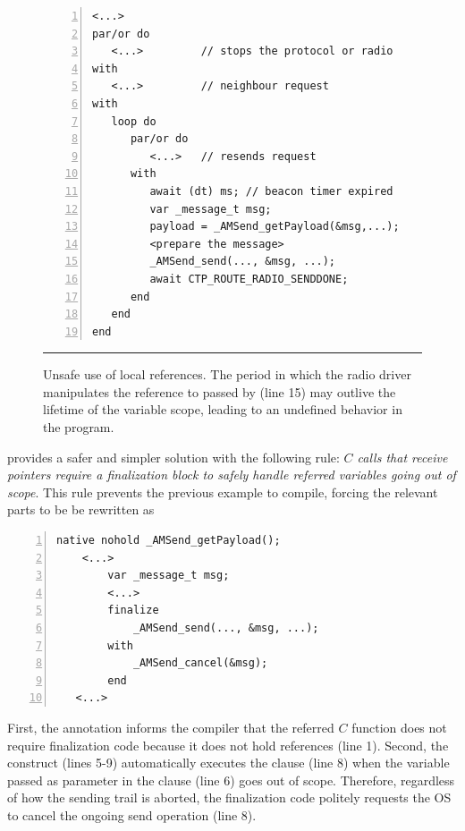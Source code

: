 \begin{figure}[t]
\begin{lstlisting}[numbers=left,xleftmargin=2em]
<...>
par/or do
   <...>         // stops the protocol or radio
with
   <...>         // neighbour request
with
   loop do
      par/or do
         <...>   // resends request
      with
         await (dt) ms; // beacon timer expired
         var _message_t msg;
         payload = _AMSend_getPayload(&msg,...);
         <prepare the message>
         _AMSend_send(..., &msg, ...);
         await CTP_ROUTE_RADIO_SENDDONE;
      end
   end
end
\end{lstlisting}
%
\rule{14cm}{0.37pt}
\caption{ Unsafe use of local references. \newline
{\small %
The period in which the radio driver manipulates the reference to  
passed by  (line 15) may outlive the lifetime of the 
variable scope, leading to an undefined behavior in the program.
}%
\label{lst.local}
}
\end{figure}

\CEU provides a safer and simpler solution with the following rule:
\emph{$C$ calls that receive pointers require a finalization block to safely 
handle referred variables going out of scope}.
This rule prevents the previous example to compile, forcing the relevant parts 
to be be rewritten as

\noindent
\begin{minipage}{\linewidth}
\begin{lstlisting}[numbers=left,xleftmargin=2em]
native nohold _AMSend_getPayload();
    <...>
        var _message_t msg;
        <...>
        finalize
            _AMSend_send(..., &msg, ...);
        with
            _AMSend_cancel(&msg);
        end
   <...>
\end{lstlisting}
\end{minipage}

First, the  annotation informs the compiler that the referred $C$ 
function does not require finalization code because it does not hold references 
(line 1).
Second, the  construct (lines 5-9) automatically executes the 
 clause (line 8) when the variable passed as parameter in the 
 clause (line 6) goes out of scope.
Therefore, regardless of how the sending trail is aborted, the finalization 
code politely requests the OS to cancel the ongoing send operation (line 8).

